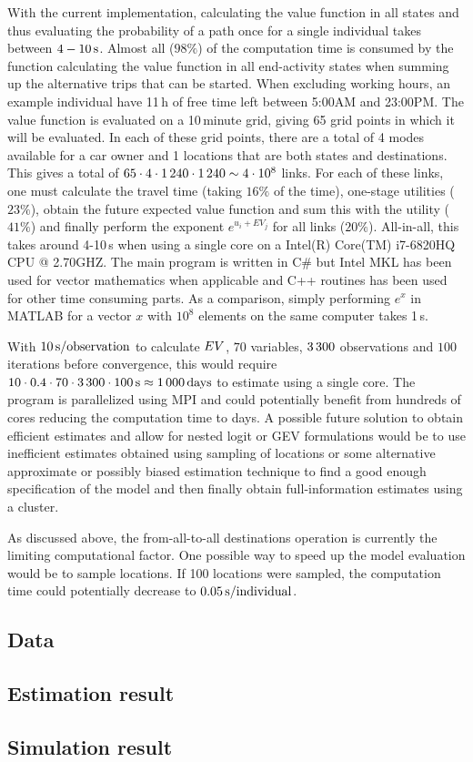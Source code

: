With the current implementation, calculating the value function in all states and thus evaluating the probability of a path once for a single individual takes between $4-10\, \mathrm{s}$. Almost all ($98\%$) of the computation time is consumed by the function calculating the value function in all end-activity states when summing up the alternative trips that can be started. When excluding working hours, an example individual have 11\,h of free time left between 5:00AM and 23:00PM. The value function is evaluated on a 10\,minute grid, giving 65 grid points in which it will be evaluated. In each of these grid points, there are a total of 4 modes available for a car owner and 1 locations that are both states and destinations. This gives a total of $65 \cdot 4 \cdot 1\, 240 \cdot 1\, 240 \sim 4 \cdot 10^8$ links. For each of these links, one must calculate the travel time (taking $16\%$ of the time), one-stage utilities ($23\%$), obtain the future expected value function and sum this with the utility ($41\%$) and finally perform the exponent $e^{u_i + EV_j}$ for all links ($20\%$). All-in-all, this takes around 4-10\,s when using a single core on a Intel(R) Core(TM) i7-6820HQ CPU @ 2.70GHZ. The main program is written in C\# but Intel MKL has been used for vector mathematics when applicable and C++ routines has been used for other time consuming parts. As a comparison, simply performing $e^x$ in MATLAB for a vector $x$ with $10^8$ elements on the same computer takes 1\,s. 

With $10\, \mathrm{s/observation}$ to calculate $EV$, $70$ variables, $3\, 300$ observations and $100$ iterations before convergence, this would require $10 \cdot 0.4 \cdot  70 \cdot 3\, 300 \cdot 100 \, \mathrm{s} \approx 1\, 000 \, \mathrm{days}$ to estimate using a single core.
The program is parallelized using MPI and could potentially benefit from hundreds of cores reducing the computation time to days. A possible future solution to obtain efficient estimates and allow for nested logit or GEV formulations would be to use inefficient estimates obtained using sampling of locations or some alternative approximate or possibly biased estimation technique to find a good enough specification of the model and then finally obtain full-information estimates using a cluster. 

 As discussed above, the from-all-to-all destinations operation is currently the limiting computational factor. One possible way to speed up the model evaluation would be to sample locations. If 100 locations were sampled, the computation time could potentially decrease to $0.05\, \mathrm{s/individual}$.  


\subsection{Data}


\subsection{Estimation result}



\subsection{Simulation result}



